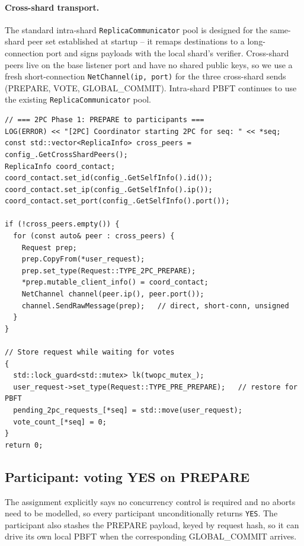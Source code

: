 \documentclass[11pt]{article}
\begin{document}
\paragraph{Cross-shard transport.} The standard intra-shard
\texttt{ReplicaCommunicator} pool is designed for the same-shard peer set
established at startup -- it remaps destinations to a long-connection
port and signs payloads with the local shard's verifier. Cross-shard
peers live on the base listener port and have no shared public keys, so
we use a fresh short-connection \texttt{NetChannel(ip, port)} for the
three cross-shard sends (PREPARE, VOTE, GLOBAL\_COMMIT). Intra-shard
PBFT continues to use the existing \texttt{ReplicaCommunicator} pool.

\begin{lstlisting}[style=cppstyle,caption={\texttt{platform/consensus/ordering/pbft/commitment.cpp} -- coordinator broadcasts 2PC PREPARE then stashes the request awaiting votes.}]
// === 2PC Phase 1: PREPARE to participants ===
LOG(ERROR) << "[2PC] Coordinator starting 2PC for seq: " << *seq;
const std::vector<ReplicaInfo> cross_peers = config_.GetCrossShardPeers();
ReplicaInfo coord_contact;
coord_contact.set_id(config_.GetSelfInfo().id());
coord_contact.set_ip(config_.GetSelfInfo().ip());
coord_contact.set_port(config_.GetSelfInfo().port());

if (!cross_peers.empty()) {
  for (const auto& peer : cross_peers) {
    Request prep;
    prep.CopyFrom(*user_request);
    prep.set_type(Request::TYPE_2PC_PREPARE);
    *prep.mutable_client_info() = coord_contact;
    NetChannel channel(peer.ip(), peer.port());
    channel.SendRawMessage(prep);   // direct, short-conn, unsigned
  }
}

// Store request while waiting for votes
{
  std::lock_guard<std::mutex> lk(twopc_mutex_);
  user_request->set_type(Request::TYPE_PRE_PREPARE);   // restore for PBFT
  pending_2pc_requests_[*seq] = std::move(user_request);
  vote_count_[*seq] = 0;
}
return 0;
\end{lstlisting}

\subsection{Participant: voting YES on PREPARE}

The assignment explicitly says no concurrency control is required and no
aborts need to be modelled, so every participant unconditionally returns
\texttt{YES}. The participant also stashes the PREPARE payload, keyed by
request hash, so it can drive its own local PBFT when the corresponding
GLOBAL\_COMMIT arrives.
\end{document}
